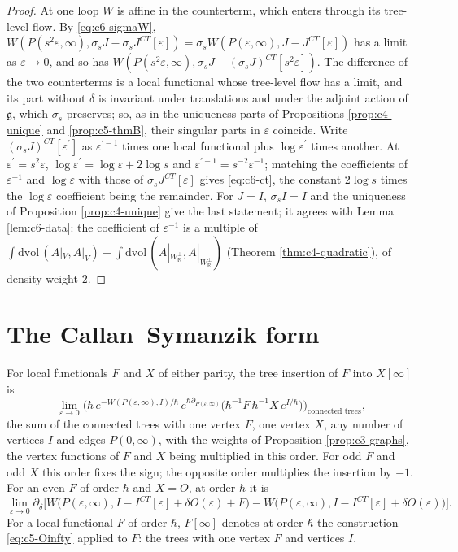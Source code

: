\begin{proof}
At one loop $W$ is affine in the counterterm, which enters through its tree-level flow. By \eqref{eq:c6-sigmaW}, $W(P(s^2\varepsilon,\infty),\sigma_s J-\sigma_s J^{CT}[\varepsilon])=\sigma_s W(P(\varepsilon,\infty),J-J^{CT}[\varepsilon])$ has a limit as $\varepsilon\to0$, and so has $W(P(s^2\varepsilon,\infty),\sigma_s J-(\sigma_s J)^{CT}[s^2\varepsilon])$. The difference of the two counterterms is a local functional whose tree-level flow has a limit, and its part without $\delta$ is invariant under translations and under the adjoint action of $\mathfrak g$, which $\sigma_s$ preserves; so, as in the uniqueness parts of Propositions \ref{prop:c4-unique} and \ref{prop:c5-thmB}, their singular parts in $\varepsilon$ coincide. Write $(\sigma_s J)^{CT}[\varepsilon^{\prime}]$ as $\varepsilon^{\prime-1}$ times one local functional plus $\log\varepsilon^{\prime}$ times another. At $\varepsilon^{\prime}=s^2\varepsilon$, $\log\varepsilon^{\prime}=\log\varepsilon+2\log s$ and $\varepsilon^{\prime-1}=s^{-2}\varepsilon^{-1}$; matching the coefficients of $\varepsilon^{-1}$ and $\log\varepsilon$ with those of $\sigma_s J^{CT}[\varepsilon]$ gives \eqref{eq:c6-ct}, the constant $2\log s$ times the $\log\varepsilon$ coefficient being the remainder. For $J=I$, $\sigma_s I=I$ and the uniqueness of Proposition \ref{prop:c4-unique} give the last statement; it agrees with Lemma \ref{lem:c6-data}: the coefficient of $\varepsilon^{-1}$ is a multiple of $\int\mathrm{dvol}\,(A|_V,A|_V)+\int\mathrm{dvol}\,(A|_{W_{\mathbb R}^\perp},A|_{W_{\mathbb R}^\perp})$ (Theorem \ref{thm:c4-quadratic}), of density weight $2$.
\end{proof}

\section{The Callan--Symanzik form}

\begin{definition}
\label{def:c6-tree}
For local functionals $F$ and $X$ of either parity, the tree insertion of $F$ into $X[\infty]$ is
\[
\lim_{\varepsilon\to0}\Big(\hbar\,e^{-W(P(\varepsilon,\infty),I)/\hbar}\,e^{\hbar\partial_{P(\varepsilon,\infty)}}\big(\hbar^{-1}F\,\hbar^{-1}X\,e^{I/\hbar}\big)\Big)_{\text{connected trees}},
\]
the sum of the connected trees with one vertex $F$, one vertex $X$, any number of vertices $I$ and edges $P(0,\infty)$, with the weights of Proposition \ref{prop:c3-graphs}, the vertex functions of $F$ and $X$ being multiplied in this order. For odd $F$ and odd $X$ this order fixes the sign; the opposite order multiplies the insertion by $-1$. For an even $F$ of order $\hbar$ and $X=O$, at order $\hbar$ it is
\[
\lim_{\varepsilon\to0}\partial_\delta\Big[W\big(P(\varepsilon,\infty),I-I^{CT}[\varepsilon]+\delta O(\varepsilon)+F\big)-W\big(P(\varepsilon,\infty),I-I^{CT}[\varepsilon]+\delta O(\varepsilon)\big)\Big].
\]
For a local functional $F$ of order $\hbar$, $F[\infty]$ denotes at order $\hbar$ the construction \eqref{eq:c5-Oinfty} applied to $F$: the trees with one vertex $F$ and vertices $I$.
\end{definition}

